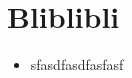 % 
%		
%		
%	
%		
%

\section{Bliblibli}\label{sect.anhang.ah}



\begin{itemize}
	\item sfasdfasdfasfasf
\end{itemize}
\newpage
